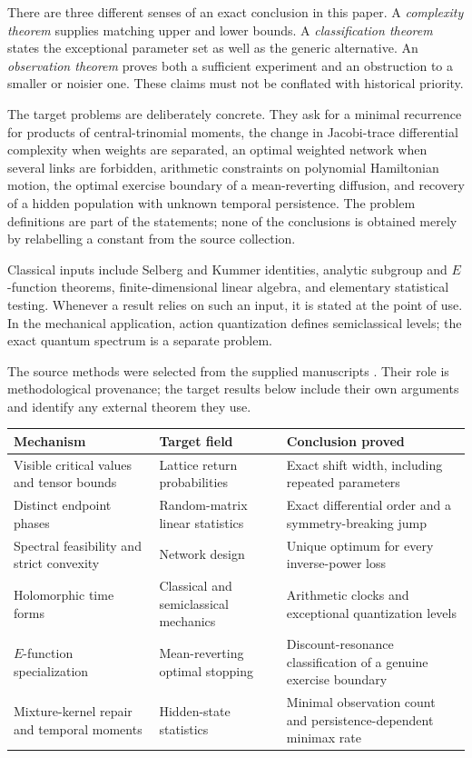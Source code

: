\documentclass[11pt,a4paper]{article}
\theoremstyle{definition}
\theoremstyle{remark}
\numberwithin{equation}{section}
\begin{document}
There are three different senses of an exact conclusion in this paper.
A \emph{complexity theorem} supplies matching upper and lower bounds.
A \emph{classification theorem} states the exceptional parameter set as well
as the generic alternative. An \emph{observation theorem} proves both a
sufficient experiment and an obstruction to a smaller or noisier one.
These claims must not be conflated with historical priority.

The target problems are deliberately concrete. They ask for a minimal
recurrence for products of central-trinomial moments, the change in
Jacobi-trace differential complexity when weights are separated, an optimal
weighted network when several links are forbidden, arithmetic constraints
on polynomial Hamiltonian motion, the optimal exercise boundary of a
mean-reverting diffusion, and recovery of a hidden population with unknown
temporal persistence. The problem definitions are part of the statements;
none of the conclusions is obtained merely by relabelling a constant from
the source collection.

Classical inputs include Selberg and Kummer identities, analytic subgroup
and $E$-function theorems, finite-dimensional linear algebra, and elementary
statistical testing. Whenever a result relies on such an input, it is stated
at the point of use. In the mechanical application, action quantization
defines semiclassical levels; the exact quantum spectrum is a separate
problem.


The source methods were selected from the supplied manuscripts
\cite{p1:Keio006transfer,p1:Keio015transfer,p5:Keio024,p1:Keio025transfer,p1:Keio028transfer,p4:Keio029,p1:Keio030transfer,p5:Keio032}.
Their role is methodological provenance; the target results below include
their own arguments and identify any external theorem they use.
\begin{center}
\small
\begin{tabular}{@{}>{\raggedright\arraybackslash}p{}>{\raggedright\arraybackslash}p{}>{\raggedright\arraybackslash}p{}@{}}
\toprule
Mechanism & Target field & Conclusion proved\\
\midrule
Visible critical values and tensor bounds & Lattice return probabilities & Exact shift width, including repeated parameters\\
Distinct endpoint phases & Random-matrix linear statistics & Exact differential order and a symmetry-breaking jump\\
Spectral feasibility and strict convexity & Network design & Unique optimum for every inverse-power loss\\
Holomorphic time forms & Classical and semiclassical mechanics & Arithmetic clocks and exceptional quantization levels\\
$E$-function specialization & Mean-reverting optimal stopping & Discount-resonance classification of a genuine exercise boundary\\
Mixture-kernel repair and temporal moments & Hidden-state statistics & Minimal observation count and persistence-dependent minimax rate\\
\bottomrule
\end{tabular}
\end{center}
\clearpage
\end{document}
